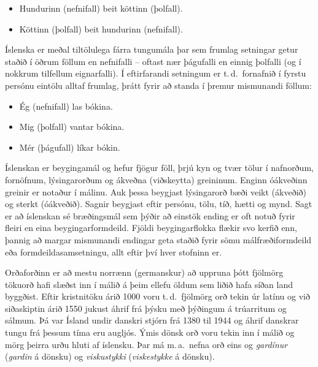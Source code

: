 \documentclass{../../metanetpaper}
\begin{document}
\begin{multicols}{2}
\begin{itemize}
\item Hundurinn (nefnifall) beit köttinn (þolfall).
\item Köttinn (þolfall) beit hundurinn (nefnifall).
\end{itemize}

Íslenska er meðal tiltölulega fárra tungumála þar sem frumlag setningar getur staðið í öðrum föllum en nefnifalli -- oftast nær þágufalli en einnig þolfalli (og í nokkrum tilfellum eignarfalli). Í eftirfarandi setningum er t.\,d.~fornafnið í fyrstu persónu eintölu alltaf frumlag, þrátt fyrir að standa í þremur mismunandi föllum:

\begin{itemize}
\item Ég (nefnifall) las bókina.
\item Mig (þolfall) vantar bókina.
\item Mér (þágufall) líkar bókin.
\end{itemize}

Íslenskan er beygingamál og hefur fjögur föll, þrjú kyn og tvær tölur í nafnorðum, fornöfnum, lýsingarorðum og ákveðna (viðskeytta) greininum. Enginn óákveðinn greinir er notaður í málinu. Auk þessa beygjast lýsingarorð bæði veikt (ákveðið) og sterkt (óákveðið). Sagnir beygjast eftir persónu, tölu, tíð, hætti og mynd. Sagt er að íslenskan sé bræðingsmál sem þýðir að einstök ending er oft notuð fyrir fleiri en eina beygingarformdeild. Fjöldi beygingarflokka flækir svo kerfið enn, þannig að margar mismunandi endingar geta staðið fyrir sömu málfræðiformdeild eða formdeildasamsetningu, allt eftir því hver stofninn er.


Orðaforðinn er að mestu norrænn (germanskur) að uppruna þótt fjölmörg tökuorð hafi slæðst inn í málið á þeim ellefu öldum sem liðið hafa síðan land byggðist. Eftir kristnitöku árið 1000 voru t.\,d.~fjölmörg orð tekin úr latínu og við siðaskiptin árið 1550 jukust áhrif frá þýsku með þýðingum á trúarritum og sálmum. Þá var Ísland undir danskri stjórn frá 1380 til 1944 og áhrif danskrar tungu frá þessum tíma eru augljós. Ýmis dönsk orð voru tekin inn í málið og mörg þeirra urðu hluti af íslensku. Þar má m.\,a.~nefna orð eins og \textit{gardínur} (\textit{gardin} á dönsku) og \textit{viskustykki} (\textit{viskestykke} á dönsku).


\end{multicols}
\end{document}
